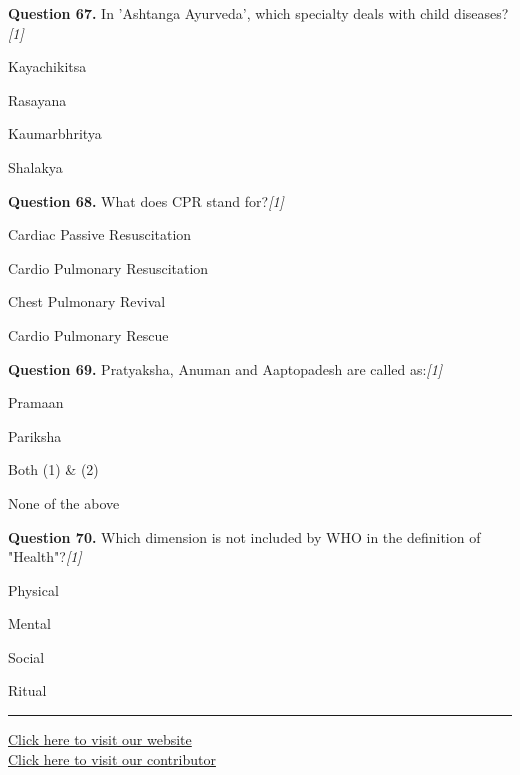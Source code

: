 \documentclass[11pt,a4paper]{article}
\newcommand{\pts}[1]{\hfill   \textit{[#1]}}
\begin{document}
\medskip


\noindent   \textbf{Question 67.} In 'Ashtanga Ayurveda', which specialty deals with child diseases?\pts{1}

\begin{parts}
  \item Kayachikitsa
  \item Rasayana
  \item Kaumarbhritya
  \item Shalakya
\end{parts}

\medskip


\noindent   \textbf{Question 68.} What does CPR stand for?\pts{1}

\begin{parts}
  \item Cardiac Passive Resuscitation
  \item Cardio Pulmonary Resuscitation
  \item Chest Pulmonary Revival
  \item Cardio Pulmonary Rescue
\end{parts}

\medskip


\noindent   \textbf{Question 69.} Pratyaksha, Anuman and Aaptopadesh are called as:\pts{1}

\begin{parts}
  \item Pramaan
  \item Pariksha
  \item Both (1) & (2)
  \item None of the above
\end{parts}

\medskip


\noindent   \textbf{Question 70.} Which dimension is not included by WHO in the definition of "Health"?\pts{1}

\begin{parts}
  \item Physical
  \item Mental
  \item Social
  \item Ritual
\end{parts}

\medskip

\vfill
\rule{\linewidth}{0.4pt}

\begin{center}\small
\href{https://bhu-exam.vercel.app/}{Click here to visit our website}\\[4pt]
\href{https://me-aryan.vercel.app/}{Click here to visit our contributor}
\end{center}
\end{document}
